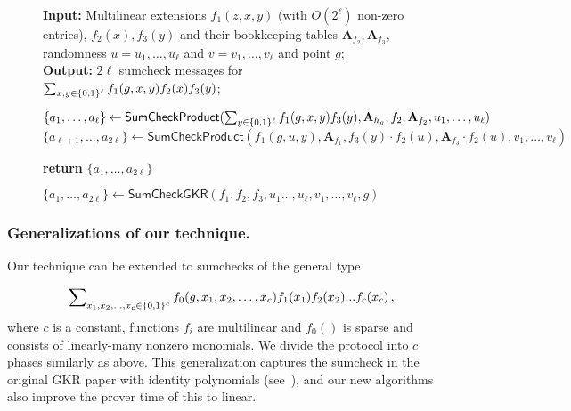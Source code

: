 {{\begin{figure}
\begin{algorithm}[H]
		\caption{\label{final_alg}$\{a_1,\ldots,a_{2\ell}\}\leftarrow \textsf{SumCheckGKR}(f_1,f_2,f_3,u_1\ldots,u_\ell,v_1,\ldots,v_\ell,g)$}\label{alg:sumcheckgkr}
		 \textbf{Input:} Multilinear extensions $f_1(z,x,y)$ (with $O(2^\ell)$ non-zero entries), $f_2(x), f_3(y)$ and their bookkeeping tables $\textbf{A}_{f_2},\textbf{A}_{f_3}$, randomness $u = u_1,\ldots,u_\ell$ and $v = v_1,\ldots,v_\ell$ and point $g$;\\
    \textbf{Output:} 
    $2\ell$ sumcheck messages for $\sum\nolimits_{x,y\in\{0,1\}^\ell}f_1(g,x,y)f_2(x)f_3(y)$;
   
		\begin{algorithmic}[1]
\State $\{a_1,\ldots,a_\ell\}\leftarrow \textsf{SumCheckProduct}(\sum_{y\in\{0,1\}^\ell}f_1(g,x,y) f_3(y), \textbf{A}_{h_g},f_2, \textbf{A}_{f_2},u_1,\ldots,u_\ell)$
\State $\{a_{\ell+1},\ldots,a_{2\ell}\}\leftarrow \textsf{SumCheckProduct}(f_1(g,u,y),\textbf{A}_{f_1} ,f_3(y)\cdot f_2(u), \textbf{A}_{f_3}\cdot f_2(u) ,v_1,\ldots,v_\ell)$

							\State \textbf{return} $\{a_1,\ldots,a_{2\ell} \}$
		\end{algorithmic}
	\end{algorithm}
	
\end{figure}





 


\subsubsection{Generalizations of our technique.}

Our technique can be extended to sumchecks of the general type

\[
\sum\nolimits_{x_1, x_2,\ldots, x_c\in\{0,1\}^c}f_0(g,x_1, x_2,\ldots, x_c)f_1(x_1)f_2(x_2)...f_c(x_c)\, ,
\]
where $c$ is a constant, functions $f_i$ are multilinear and $f_0()$ is sparse and consists of linearly-many nonzero monomials. We divide the protocol into $c$ phases similarly as above. This generalization captures the sumcheck in the original GKR paper with identity polynomials (see~\cite{GKR}), and our new algorithms also improve the prover time of this to linear.





















}}
